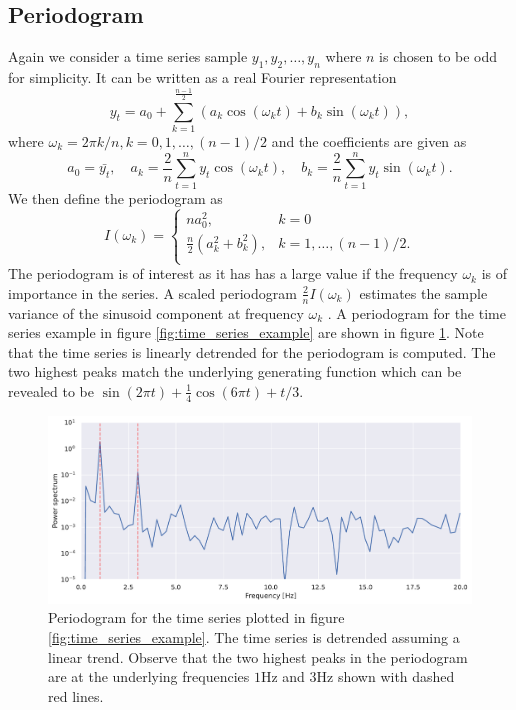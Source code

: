 \documentclass[a4paper]{memoir}
\theoremstyle{plain}
\theoremstyle{definition}
\theoremstyle{remark}
\begin{document}
\subsection{Periodogram}
Again we consider a time series sample $y_1, y_2, \hdots, y_n$ where $n$ is chosen to be odd for simplicity.
It can be written as a real Fourier representation 
\begin{equation*}
        y_t = a_0 + \sum_{k = 1}^{\frac{n-1}{2}} (a_k \cos(\omega_k t) + b_k \sin (\omega_kt)),
\end{equation*}
where $\omega_k = 2\pi k / n, k =0, 1, \hdots, (n -1)/2$ and the coefficients are given as 
\begin{equation*}
        a_0 = \bar{y_t}, \quad a_k = \frac{2}{n}\sum_{t = 1}^{n}y_t \cos(\omega_kt), \quad b_k = \frac{2}{n} \sum_{ t = 1}^{n} y_t \sin (\omega_kt).
\end{equation*}
We then define the periodogram as 
\begin{equation}\label{eq:periodogram}
        I(\omega_k) = 
                \begin{cases}
                        na_0^2, & k=0  \\
                        \frac{n}{2}(a_k^2 + b_k^2), & k = 1, \hdots, (n-1)/2. \\
                \end{cases}
\end{equation}
The periodogram is of interest as it has has a large value if the frequency $\omega_k$ is of importance in the series.
A scaled periodogram $\frac{2}{n}I(\omega_k)$ estimates the sample variance of the sinusoid component at frequency $\omega_k$ \cite{shumway}.
A periodogram for the time series example in figure \ref{fig:time_series_example} are shown in figure \ref{fig:periodogram_basic}.
Note that the time series is linearly detrended for the periodogram is computed.
The two highest peaks match the underlying generating function which can be revealed to be $\sin(2\pi t) + \frac{1}{4} \cos(6 \pi t) + t / 3$.

\begin{figure}[tb]
        \centering
        \includegraphics[width=\linewidth]{./code/figures/periodogram_basic.pdf}
        \caption{Periodogram for the time series plotted in figure \ref{fig:time_series_example}.
        The time series is detrended assuming a linear trend.
        Observe that the two highest peaks in the periodogram are at the underlying frequencies $1$Hz and $3$Hz shown with dashed red lines.}
        \label{fig:periodogram_basic}
\end{figure}
\end{document}
